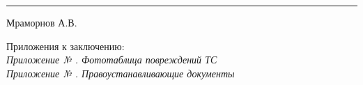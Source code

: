   \hfill    \rule{45mm}{0.1 mm}   {Мраморнов А.В.}\\
\vspace{7mm}
\relax



\noindent Приложения к заключению:\\

\noindent \textit{\small 
	Приложение № \Rownum. Фототаблица повреждений ТС \\
	Приложение № \Rownum. Правоустанавливающие документы\\}

\pagebreak
%
